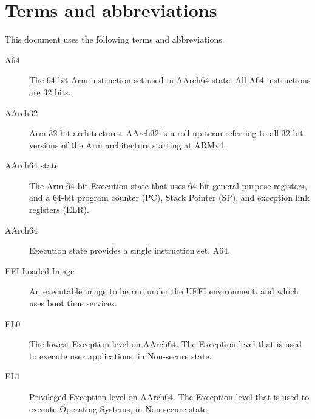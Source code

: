 \documentclass[a4paper,10pt,oneside,english]{sphinxmanual}
\begin{document}
\chapter{Terms and abbreviations}
\label{\detokenize{abbreviations:terms-and-abbreviations}}\label{\detokenize{abbreviations::doc}}
This document uses the following terms and abbreviations.
\begin{description}
\item[{A64\label{\detokenize{abbreviations:term-a64}}}] \leavevmode
The 64-bit Arm instruction set used in AArch64 state.
All A64 instructions are 32 bits.

\item[{AArch32\label{\detokenize{abbreviations:term-aarch32}}}] \leavevmode
Arm 32-bit architectures. AArch32 is a roll up term referring to all
32-bit versions of the Arm architecture starting at ARMv4.

\item[{AArch64 state\label{\detokenize{abbreviations:term-aarch64-state}}}] \leavevmode
The Arm 64-bit Execution state that uses 64-bit general purpose
registers, and a 64-bit program counter (PC), Stack Pointer (SP), and
exception link registers (ELR).

\item[{AArch64\label{\detokenize{abbreviations:term-aarch64}}}] \leavevmode
Execution state provides a single instruction set, A64.

\item[{EFI Loaded Image\label{\detokenize{abbreviations:term-efi-loaded-image}}}] \leavevmode
An executable image to be run under the UEFI environment,
and which uses boot time services.

\item[{EL0\label{\detokenize{abbreviations:term-el0}}}] \leavevmode
The lowest Exception level on AArch64. The Exception level that is used to execute
user applications, in Non-secure state.

\item[{EL1\label{\detokenize{abbreviations:term-el1}}}] \leavevmode
Privileged Exception level on AArch64. The Exception level that is used to execute
Operating Systems, in Non-secure state.


\end{description}
\end{document}
